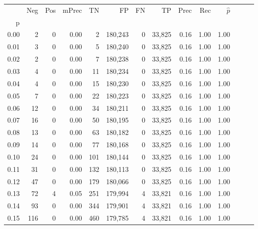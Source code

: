 \begin{tabular}{rrrrrrrrrrrrrr}
\toprule
{} &    Neg &  Pos & mPrec &       TN &       FP &      FN &      TP &  Prec &   Rec & $\hat{p}$ \\
p    &        &      &       &          &          &         &         &       &       &           \\
\midrule
0.00 &      2 &    0 &  0.00 &        2 &  180,243 &       0 &  33,825 &  0.16 &  1.00 &      1.00 \\
0.01 &      3 &    0 &  0.00 &        5 &  180,240 &       0 &  33,825 &  0.16 &  1.00 &      1.00 \\
0.02 &      2 &    0 &  0.00 &        7 &  180,238 &       0 &  33,825 &  0.16 &  1.00 &      1.00 \\
0.03 &      4 &    0 &  0.00 &       11 &  180,234 &       0 &  33,825 &  0.16 &  1.00 &      1.00 \\
0.04 &      4 &    0 &  0.00 &       15 &  180,230 &       0 &  33,825 &  0.16 &  1.00 &      1.00 \\
0.05 &      7 &    0 &  0.00 &       22 &  180,223 &       0 &  33,825 &  0.16 &  1.00 &      1.00 \\
0.06 &     12 &    0 &  0.00 &       34 &  180,211 &       0 &  33,825 &  0.16 &  1.00 &      1.00 \\
0.07 &     16 &    0 &  0.00 &       50 &  180,195 &       0 &  33,825 &  0.16 &  1.00 &      1.00 \\
0.08 &     13 &    0 &  0.00 &       63 &  180,182 &       0 &  33,825 &  0.16 &  1.00 &      1.00 \\
0.09 &     14 &    0 &  0.00 &       77 &  180,168 &       0 &  33,825 &  0.16 &  1.00 &      1.00 \\
0.10 &     24 &    0 &  0.00 &      101 &  180,144 &       0 &  33,825 &  0.16 &  1.00 &      1.00 \\
0.11 &     31 &    0 &  0.00 &      132 &  180,113 &       0 &  33,825 &  0.16 &  1.00 &      1.00 \\
0.12 &     47 &    0 &  0.00 &      179 &  180,066 &       0 &  33,825 &  0.16 &  1.00 &      1.00 \\
0.13 &     72 &    4 &  0.05 &      251 &  179,994 &       4 &  33,821 &  0.16 &  1.00 &      1.00 \\
0.14 &     93 &    0 &  0.00 &      344 &  179,901 &       4 &  33,821 &  0.16 &  1.00 &      1.00 \\
0.15 &    116 &    0 &  0.00 &      460 &  179,785 &       4 &  33,821 &  0.16 &  1.00 &      1.00 \\

\end{tabular}
